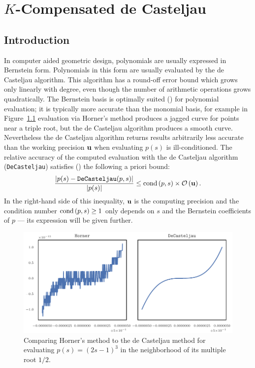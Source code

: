 \chapter{\(K\)-Compensated de Casteljau}\label{chap:k-compensated}

\section{Introduction}

In computer aided geometric design, polynomials are usually expressed in
Bernstein form. Polynomials in this form are usually evaluated by the
de Casteljau algorithm. This algorithm has a round-off error bound
which grows only linearly with degree, even though the number of
arithmetic operations grows quadratically. The Bernstein basis is
optimally suited (\cite{Farouki1987, Delgado2015, Mainar2005})
for polynomial evaluation; it is
typically more accurate than the monomial basis, for example in
Figure~\ref{fig:horner-inferior} evaluation via Horner's method produces
a jagged curve for points near a triple root, but the de Casteljau algorithm
produces a smooth curve. Nevertheless the de Casteljau
algorithm returns results arbitrarily less accurate than the working
precision \(\mathbf{u}\) when evaluating \(p(s)\) is ill-conditioned.
The relative accuracy of the computed
evaluation with the de Casteljau algorithm (\texttt{DeCasteljau}) satisfies
(\cite{Mainar1999}) the following a priori bound:
\begin{equation}\label{eq:de-casteljau-error}
  \frac{\left|p(s) - \mathtt{DeCasteljau}(p, s)\right|}{\left|p(s)\right|} \leq
  \operatorname{cond}\left(p, s\right) \times \mathcal{O}\left(\mathbf{u}\right).
\end{equation}
In the right-hand side of this inequality, \(\mathbf{u}\) is the computing
precision and the condition number \(\operatorname{cond}\left(p, s\right) \geq 1\) only depends
on \(s\) and the Bernstein coefficients of \(p\) --- its expression will
be given further.

\begin{figure}
  \includegraphics{../images/k-compensated/horner_inferior.pdf}
  \centering
  \captionsetup{width=.75\linewidth}
  \caption{Comparing Horner's method to the de Casteljau method for
    evaluating \(p(s) = (2s - 1)^3\) in the neighborhood of its
    multiple root \(1/2\).}
  \label{fig:horner-inferior}
\end{figure}

